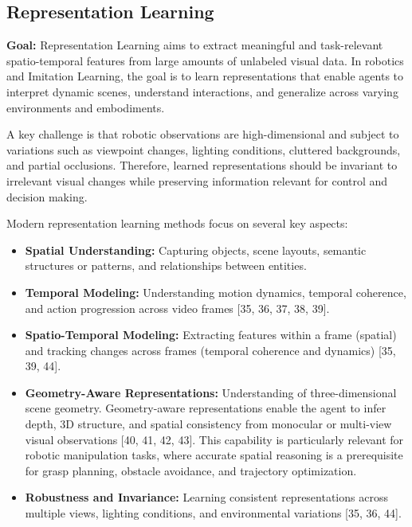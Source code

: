\subsection{Representation Learning}
\textbf{Goal:} Representation Learning aims to extract meaningful and task-relevant spatio-temporal features from large amounts of unlabeled visual data. In robotics and Imitation Learning, the goal is to learn representations that enable agents to interpret dynamic scenes, understand interactions, and generalize across varying environments and embodiments. 

A key challenge is that robotic observations are high-dimensional and subject to variations such as viewpoint changes, lighting conditions, cluttered backgrounds, and partial occlusions. Therefore, learned representations should be invariant to irrelevant visual changes while preserving information relevant for control and decision making.

Modern representation learning methods focus on several key aspects:
\begin{itemize}
    \item \textbf{Spatial Understanding:} Capturing objects, scene layouts, semantic structures or patterns, and relationships between entities.
    
    \item \textbf{Temporal Modeling:} Understanding motion dynamics, temporal coherence, and action progression across video frames [35, 36, 37, 38, 39].
    
    \item \textbf{Spatio-Temporal Modeling:} Extracting features within a frame (spatial) and tracking changes across frames (temporal coherence and dynamics) [35, 39, 44].
    
    \item \textbf{Geometry-Aware Representations:} Understanding of three-dimensional scene geometry. Geometry-aware representations enable the agent to infer depth, 3D structure, and spatial consistency from monocular or multi-view visual observations [40, 41, 42, 43]. This capability is particularly relevant for robotic manipulation tasks, where accurate spatial reasoning is a prerequisite for grasp planning, obstacle avoidance, and trajectory optimization.
    
    \item \textbf{Robustness and Invariance:} Learning consistent representations across multiple views, lighting conditions, and environmental variations [35, 36, 44].
\end{itemize}

